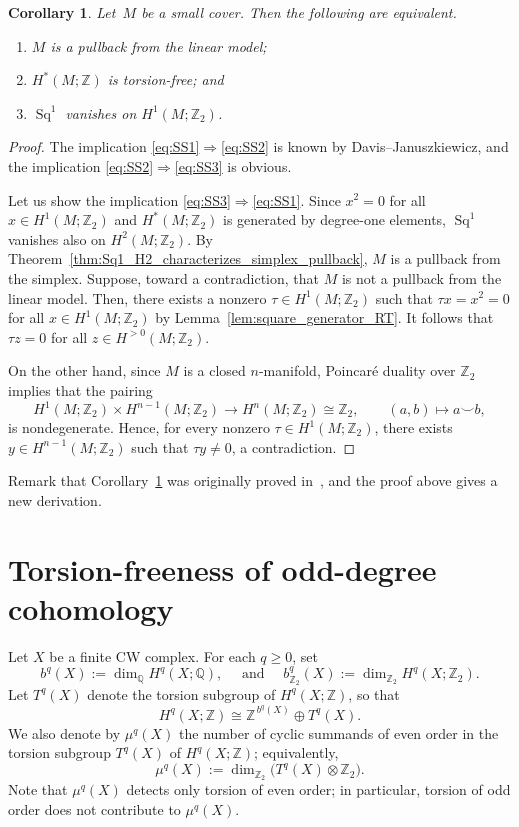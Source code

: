 \documentclass{amsart}
\newcommand{\Q}{\mathbb{Q}}
\newcommand{\Z}{\mathbb{Z}}
\DeclareMathOperator{\Sq}{Sq}
\theoremstyle{plain}
\newtheorem{corollary}[theorem]{Corollary}
\numberwithin{equation}{section}
\theoremstyle{definition}
\theoremstyle{remark}
\begin{document}
\begin{corollary} \label{cor:pullback_linear_model}
    Let~$M$ be a small cover.
    Then the following are equivalent.
    \begin{enumerate}
        \item\label{eq:SS1} $M$ is a pullback from the linear model;
        \item\label{eq:SS2} $H^\ast(M;\Z)$ is torsion-free; and
        \item\label{eq:SS3} $\Sq^1$ vanishes on $H^1(M;\Z_2)$.
    \end{enumerate}
\end{corollary}
\begin{proof}
    The implication \eqref{eq:SS1}$\Rightarrow$\eqref{eq:SS2} is known by Davis--Januszkiewicz, and the implication \eqref{eq:SS2}$\Rightarrow$\eqref{eq:SS3} is obvious.
    
    Let us show the implication \eqref{eq:SS3}$\Rightarrow$\eqref{eq:SS1}.
    Since $x^2 =0$ for all $x \in H^1(M;\Z_2)$ and $H^\ast(M;\Z_2)$ is generated by degree-one elements, $\Sq^1$ vanishes also on $H^2(M;\Z_2)$.
    By Theorem~\ref{thm:Sq1_H2_characterizes_simplex_pullback}, $M$ is a pullback from the simplex.
    Suppose, toward a contradiction, that $M$ is not a pullback from the linear model.
    Then, there exists a nonzero $\tau \in H^1 (M;\Z_2)$ such that $\tau x = x^2 = 0$  for all $x \in H^1(M;\Z_2)$ by Lemma~\ref{lem:square_generator_RT}.
    It follows that $\tau z = 0$ for all $z \in H^{>0}(M;\Z_2)$.
    
    On the other hand, since $M$ is a closed $n$-manifold, Poincar\'e duality over $\Z_2$ implies that the pairing
    $$
        H^1(M;\Z_2)\times H^{n-1}(M;\Z_2)\to H^n(M;\Z_2)\cong \Z_2, \qquad (a,b)\mapsto a\smile b,
    $$
    is nondegenerate. 
    Hence, for every nonzero $\tau \in H^1(M;\Z_2)$, there exists $y\in H^{n-1}(M;\Z_2)$ such that $\tau y \neq 0$, a contradiction.
\end{proof}

Remark that Corollary~\ref{cor:pullback_linear_model} was originally proved 
in~\cite{Cai-Choi-Park2020}, and the proof above gives a new derivation.

\section{Torsion-freeness of odd-degree cohomology}\label{sec:torsionfree}

Let $X$ be a finite CW complex. For each $q\ge 0$, set
$$
    b^q(X):=\dim_{\Q} H^q(X;\Q), \quad \text{ and } \quad b^q_{\Z_2}(X):=\dim_{\Z_2} H^q(X;\Z_2).
$$
Let $T^q(X)$ denote the torsion subgroup of $H^q(X;\Z)$, so that
$$
    H^q(X;\Z)\cong \Z^{\,b^q(X)}\oplus T^q(X).
$$
We also denote by $\mu^q(X)$ the number of cyclic summands of even order in the torsion subgroup $T^q(X)$ of $H^q(X;\Z)$; equivalently,
$$
    \mu^q(X):=\dim_{\Z_2}\bigl(T^q(X)\otimes \Z_2\bigr).
$$
Note that $\mu^q(X)$ detects only torsion of even order; in particular, torsion of odd order does not contribute to $\mu^q(X)$.
\end{document}
